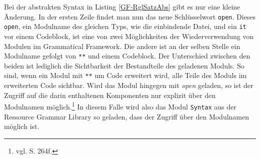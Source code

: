 
Bei der abstrakten Syntax in Listing \ref{GF-RglSatzAbs} gibt es nur eine kleine Änderung. In der ersten Zeile findet man nun das neue Schlüsselwort \texttt{open}. Dieses \texttt{open}, ein Modulname des gleichen Typs, wie die einbindende Datei, und ein \texttt{it} vor einem Codeblock, ist eine von zwei Möglichkeiten der Wiederverwendung von Modulen im Grammatical Framework. Die andere ist an der selben Stelle ein Modulname gefolgt von \texttt{**} und einem Codeblock. Der Unterschied zwischen den beiden ist lediglich die Sichtbarkeit der Bestandteile des geladenen Moduls. So sind, wenn ein Modul mit \texttt{**} um Code erweitert wird, alle Teile des Moduls im erweiterten Code sichtbar. Wird das Modul hingegen mit \textit{open} geladen, so ist der Zugriff auf die darin enthaltenen Komponenten nur explizit über den Modulnamen möglich.\footnote{vgl. \cite{RANTA2011} S. 264f.} In diesem Falle wird also das Modul \texttt{Syntax} aus der Ressource Grammar Library so geladen, dass der Zugriff über den Modulnamen möglich ist. \par

